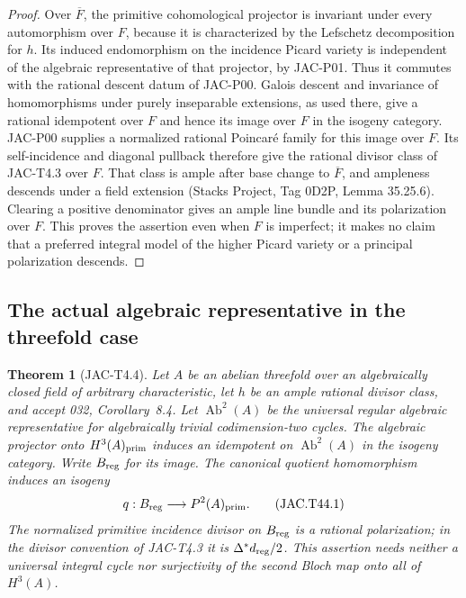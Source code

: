 \documentclass[11pt,a4paper]{article}
\newtheorem{theorem}{Theorem}[section]
\begin{document}
\begin{proof}
Over $\overline F$, the primitive cohomological projector is invariant
under every automorphism over $F$, because it is characterized by the
Lefschetz decomposition for $h$. Its induced endomorphism on the
incidence Picard variety is independent of the algebraic representative
of that projector, by JAC-P01. Thus it commutes with the rational
descent datum of JAC-P00. Galois descent and invariance of homomorphisms
under purely inseparable extensions, as used there, give a rational
idempotent over $F$ and hence its image over $F$ in the isogeny category.
JAC-P00 supplies a normalized rational Poincar\'e family for this image
over $F$. Its self-incidence and diagonal pullback therefore give the
rational divisor class of JAC-T4.3 over $F$. That class is ample after
base change to $\overline F$, and ampleness descends under a field
extension (Stacks Project, Tag 0D2P, Lemma 35.25.6).
Clearing a positive denominator gives an ample line bundle
and its polarization over $F$. This proves the assertion even when
$F$ is imperfect; it makes no claim that a preferred integral model of
the higher Picard variety or a principal polarization descends.
\end{proof}


\subsection{The actual algebraic representative in the threefold case}

\begin{theorem}[JAC-T4.4]
\label{thm:T44}
Let $A$ be an abelian threefold over an algebraically closed field of
arbitrary characteristic, let $h$ be an ample rational divisor class,
and accept 032, Corollary~8.4. Let $\operatorname{Ab}^2(A)$ be the
universal regular algebraic representative for algebraically trivial
codimension-two cycles. The algebraic projector onto
$H^3(A)_{\rm prim}$ induces an idempotent on
$\operatorname{Ab}^2(A)$ in the isogeny category. Write $B_{\rm reg}$
for its image. The canonical quotient homomorphism induces an isogeny
\[
 q:B_{\rm reg}\longrightarrow P^2(A)_{\rm prim}.
                                                        \tag{JAC.T44.1}
\]
The normalized primitive incidence divisor on $B_{\rm reg}$ is a
rational polarization; in the divisor convention of JAC-T4.3 it is
$\Delta^*d_{\rm reg}/2$. This assertion needs neither a universal
integral cycle nor surjectivity of the second Bloch map onto all of
$H^3(A)$.
\end{theorem}
\end{document}
